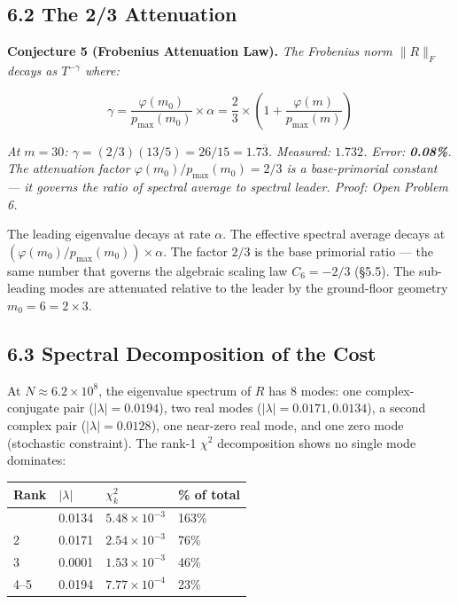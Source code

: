 \documentclass[
  11pt,
]{article}
\newcounter{none} %
\numberwithin{equation}{section}
\begin{document}
\subsection{6.2 The 2/3 Attenuation}\label{the-23-attenuation}

\textbf{Conjecture 5 (Frobenius Attenuation Law).} \emph{The Frobenius
norm \(\|R\|_F\) decays as \(T^{-\gamma}\) where:}

\begin{equation}\boxed{\gamma = \frac{\varphi(m_0)}{p_{\max}(m_0)} \times \alpha = \frac{2}{3} \times \left(1 + \frac{\varphi(m)}{p_{\max}(m)}\right)}\end{equation}

\emph{At \(m = 30\): \(\gamma = (2/3)(13/5) = 26/15 = 1.7\overline{3}\).
Measured: \(1.732\). Error: \textbf{0.08\%}. The attenuation factor
\(\varphi(m_0)/p_{\max}(m_0) = 2/3\) is a base-primorial constant --- it
governs the ratio of spectral average to spectral leader. Proof: Open
Problem 6.}

The leading eigenvalue decays at rate \(\alpha\). The effective spectral
average decays at \((\varphi(m_0)/p_{\max}(m_0)) \times \alpha\). The
factor \(2/3\) is the base primorial ratio --- the same number that
governs the algebraic scaling law \(C_6 = -2/3\) (§5.5). The sub-leading
modes are attenuated relative to the leader by the ground-floor geometry
\(m_0 = 6 = 2 \times 3\).

\subsection{6.3 Spectral Decomposition of the
Cost}\label{spectral-decomposition-of-the-cost}

At \(N \approx 6.2 \times 10^8\), the eigenvalue spectrum of \(R\) has 8
modes: one complex-conjugate pair (\(|\lambda| = 0.0194\)), two real
modes (\(|\lambda| = 0.0171, 0.0134\)), a second complex pair
(\(|\lambda| = 0.0128\)), one near-zero real mode, and one zero mode
(stochastic constraint). The rank-1 \(\chi^2\) decomposition shows no
single mode dominates:

{\def\LTcaptype{none} %
\begin{longtable}[]{@{}llll@{}}
\toprule\noalign{}
Rank & \(\lvert\lambda\rvert\) & \(\chi^2_k\) & \% of total \\
\midrule\noalign{}
\endhead
\bottomrule\noalign{}
\endlastfoot
1 & 0.0134 & \(5.48 \times 10^{-3}\) & 163\% \\
2 & 0.0171 & \(2.54 \times 10^{-3}\) & 76\% \\
3 & 0.0001 & \(1.53 \times 10^{-3}\) & 46\% \\
4--5 & 0.0194 & \(7.77 \times 10^{-4}\) & 23\% \\
\end{longtable}
}
\end{document}
